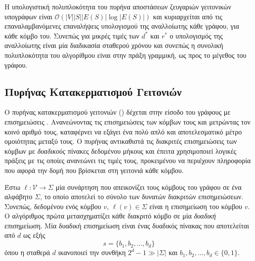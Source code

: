 Η υπολογιστική πολυπλοκότητα του πυρήνα αποστάσεων ζευγαριών γειτονικών υπογράφων είναι $\mathcal{O}(|V| |S| |E(S)| \log |E(S)|)$ και κυριαρχείται από τις επαναλαμβανόμενες επαναλήψεις υπολογισμού της αναλλοίωτης κάθε γράφου, για κάθε κόμβο του.
Συνεπώς για μικρές τιμές των $d^*$ και $r^*$ ο υπολογισμός της αναλλοίωτης είναι μία διαδικασία σταθερού χρόνου και συνεπώς η συνολική πολυπλοκότητα του αλγορίθμου είναι στην πράξη γραμμική, ως προς το μέγεθος του γράφου.

\subsection{Πυρήνας Κατακερματισμού Γειτονιών}
\label{ssec:nh}
Ο πυρήνας κατακερματισμού γειτονιών () δέχεται στην είσοδο του γράφους με επισημειώσεις \cite{Hido2009}.
Ανανεώνοντας τις επισημειώσεις των κόμβων τους και μετρώντας τον κοινό αριθμό τους, καταφέρνει να εξάγει ένα πολύ απλό και αποτελεσματικό μέτρο ομοιότητας μεταξύ τους.
Ο πυρήνας αντικαθιστά τις διακριτές επισημειώσεις των κόμβων με \textit{δυαδικούς} πίνακες δεδομένου μήκους και έπειτα χρησιμοποιεί λογικές πράξεις με τις οποίες ανανεώνει τις τιμές τους, προκειμένου να περιέχουν πληροφορία που αφορά την δομή που βρίσκεται στη γειτονιά κάθε κόμβου.

Έστω $\ell : \mathcal{V} \rightarrow \Sigma$ μία συνάρτηση που απεικονίζει τους κόμβους του γράφου σε ένα αλφάβητο $\Sigma$, το οποίο αποτελεί το σύνολο των δυνατών διακριτών επισημειώσεων.
Συνεπώς, δεδομένου ενός κόμβου $v$, $\ell(v) \in \Sigma$  είναι η επισημείωση του κόμβου $v$.
Ο αλγόριθμος πρώτα μετασχηματίζει κάθε διακριτό κόμβο σε μία \textit{δυαδική} επισημείωση.
Μία δυαδική επισημείωση είναι ένας δυαδικός πίνακας που αποτελείται από $d$  ως εξής
\begin{equation}
    s = \{ b_1, b_2, \ldots, b_d \}
\end{equation}
όπου η σταθερά $d$ ικανοποιεί την συνθήκη $2^d - 1 \gg |\Sigma|$ και $b_1, b_2, \ldots, b_d \in \{0, 1\}$.

